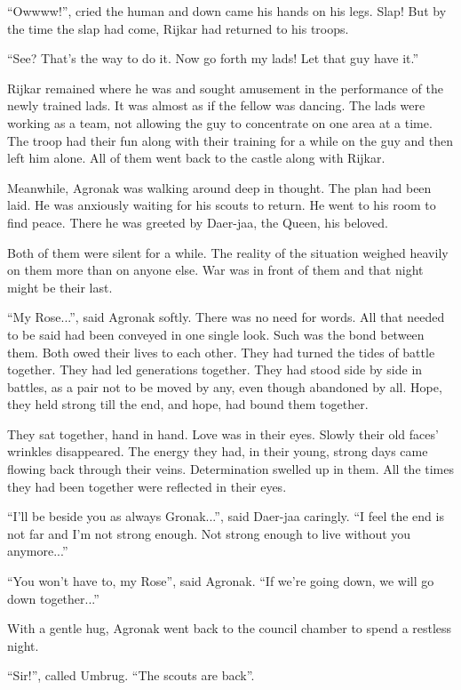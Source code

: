 \documentclass[twoside,11pt,titlepage]{article}
\begin{document}
``Owwww!'', cried the human and down came his hands on his legs. Slap! But by the time the slap had come, Rijkar had returned to his troops.

``See? That's the way to do it. Now go forth my lads! Let that guy have it.''

Rijkar remained where he was and sought amusement in the performance of the newly trained lads. It was almost as if the fellow was dancing. The lads were working as a team, not allowing the guy to concentrate on one area at a time. The troop had their fun along with their training for a while on the guy and then left him alone. All of them went back to the castle along with Rijkar.

Meanwhile, Agronak was walking around deep in thought. The plan had been laid. He was anxiously waiting for his scouts to return. He went to his room to find peace. There he was greeted by Daer-jaa, the Queen, his beloved.

Both of them were silent for a while. The reality of the situation weighed heavily on them more than on anyone else. War was in front of them and that night might be their last.

``My Rose...'', said Agronak softly. There was no need for words. All that needed to be said had been conveyed in one single look. Such was the bond between them. Both owed their lives to each other. They had turned the tides of battle together. They had led generations together. They had stood side by side in battles, as a pair not to be moved by any, even though abandoned by all. Hope, they held strong till the end, and hope, had bound them together.

They sat together, hand in hand. Love was in their eyes. Slowly their old faces' wrinkles disappeared. The energy they had, in their young, strong days came flowing back through their veins. Determination swelled up in them. All the times they had been together were reflected in their eyes.

``I'll be beside you as always Gronak...'', said Daer-jaa caringly. ``I feel the end is not far and I'm not strong enough. Not strong enough to live without you anymore...''

``You won't have to, my Rose'', said Agronak. ``If we're going down, we will go down together...''

With a gentle hug, Agronak went back to the council chamber to spend a restless night.

``Sir!'', called Umbrug. ``The scouts are back''.
\end{document}
